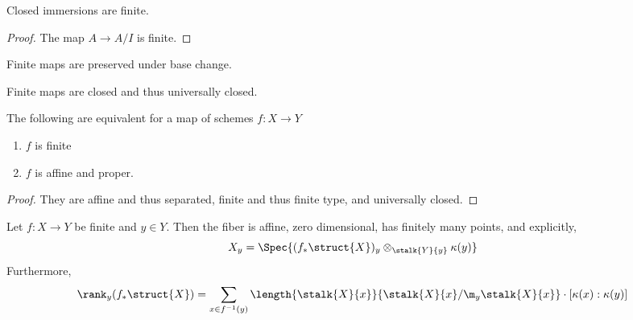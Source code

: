 \documentclass[12pt]{article}
\begin{document}
\begin{prop}
Closed immersions are finite.
\end{prop}

\begin{proof}
The map $A \to A / I$ is finite.
\end{proof}

\begin{prop}
Finite maps are preserved under base change.
\end{prop}

\begin{prop}
Finite maps are closed and thus universally closed.
\end{prop}


\begin{prop}
The following are equivalent for a map of schemes $f : X \to Y$
\begin{enumerate}
\item $f$ is finite
\item $f$ is affine and proper.
\end{enumerate}
\end{prop}

\begin{proof}
They are affine and thus separated, finite and thus finite type, and universally closed.
\end{proof}


\begin{prop}
Let $f : X \to Y$ be finite and $y \in Y$. Then the fiber is affine, zero dimensional, has finitely many points, and explicitly,
\[ X_y = \Spec{(f_* \struct{X})_y \otimes_{\stalk{Y}{y}} \kappa(y)} \]
Furthermore,
\[ \rank_y{(f_* \struct{X})} = \sum_{x \in f^{-1}(y)} \length{\stalk{X}{x}}{\stalk{X}{x} / \m_y \stalk{X}{x}} \cdot [\kappa(x) : \kappa(y)] \]
\end{prop}
\end{document}
